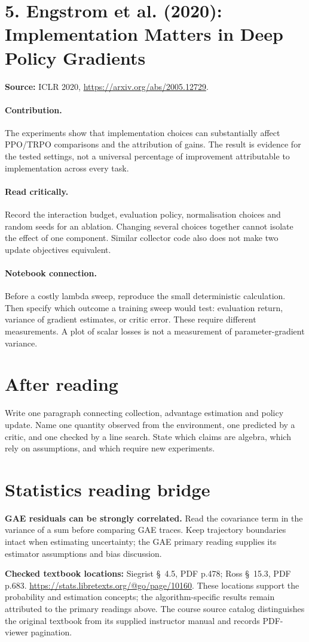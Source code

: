 \documentclass[11pt]{scrartcl}
\begin{document}
\section*{5. Engstrom et al. (2020): Implementation Matters in Deep Policy Gradients}
\textbf{Source:} ICLR 2020, \url{https://arxiv.org/abs/2005.12729}.

\paragraph{Contribution.} The experiments show that implementation choices
can substantially affect PPO/TRPO comparisons and the attribution of gains.
The result is evidence for the tested settings, not a universal percentage
of improvement attributable to implementation across every task.

\paragraph{Read critically.} Record the interaction budget, evaluation policy,
normalisation choices and random seeds for an ablation. Changing several
choices together cannot isolate the effect of one component. Similar
collector code also does not make two update objectives equivalent.

\paragraph{Notebook connection.} Before a costly lambda sweep, reproduce the
small deterministic calculation. Then specify which outcome a training sweep
would test: evaluation return, variance of gradient estimates, or critic error.
These require different measurements. A plot of scalar losses is not a
measurement of parameter-gradient variance.

\section*{After reading}
Write one paragraph connecting collection, advantage estimation and policy
update. Name one quantity observed from the environment, one predicted by a
critic, and one checked by a line search. State which claims are algebra,
which rely on assumptions, and which require new experiments.
\section*{Statistics reading bridge}
\textbf{GAE residuals can be strongly correlated.} Read the covariance term in the variance of a sum before comparing GAE traces. Keep trajectory boundaries intact when estimating uncertainty; the GAE primary reading supplies its estimator assumptions and bias discussion.

\textbf{Checked textbook locations:} Siegrist \S~4.5, PDF p.478; Ross \S~15.3, PDF p.683. \url{https://stats.libretexts.org/@go/page/10160}. These locations support the probability and estimation concepts; the algorithm-specific results remain attributed to the primary readings above. The course source catalog distinguishes the original textbook from its supplied instructor manual and records PDF-viewer pagination.
\end{document}
